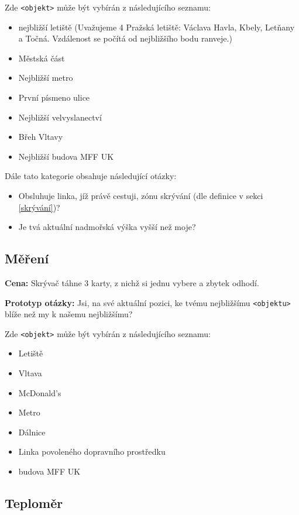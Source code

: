 Zde \verb|<objekt>| může být vybírán z následujícího seznamu:

\begin{itemize}
	\item nejbližší letiště (Uvažujeme 4 Pražská letiště: Václava Havla, Kbely, Letňany a Točná. Vzdálenost se počítá od nejbližšího bodu ranveje.)
	\item Městská část
	\item Nejbližší metro
	\item První písmeno ulice
	\item Nejbližší velvyslanectví
	\item Břeh Vltavy
	\item Nejbližší budova MFF UK
\end{itemize}

Dále tato kategorie obsahuje následující otázky:

\begin{itemize}
	\item Obsluhuje linka, jíž právě cestuji, zónu skrývání (dle definice v sekci \ref{skrývání})?
	\item Je tvá aktuální nadmořská výška vyšší než moje?
\end{itemize}


\subsection{Měření}

\textbf{Cena:} Skrývač táhne 3 karty, z nichž si jednu vybere a zbytek odhodí.

\textbf{Prototyp otázky:} Jsi, na své aktuální pozici, ke tvému nejbližšímu \verb|<objektu>| blíže než my k našemu nejbližšímu?

Zde \verb|<objekt>| může být vybírán z následujícího seznamu:

\begin{itemize}
	\item Letiště
	\item Vltava
	\item McDonald's
	\item Metro
	\item Dálnice
	\item Linka povoleného dopravního prostředku
	\item budova MFF UK
\end{itemize}

\subsection{Teploměr}

